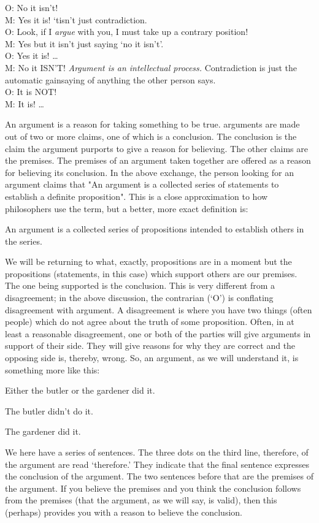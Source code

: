 {\begin{multicols}{2}
O: No it isn't!\\
M: Yes it is! ‘tisn't just contradiction.\\
O: Look, if I \emph{argue} with you, I must take up a contrary position!\\
M: Yes but it isn't just saying ‘no it isn't'.\\
O: Yes it is!
\ldots\\
M: No it ISN'T! \emph{Argument is an intellectual process.} Contradiction is just the automatic gainsaying of anything the other person says.\\
O: It is NOT!\\
M: It is!
\ldots 
\end{multicols}}

An argument is a reason for taking something to be true. \Glspl{argument} are made out of two or more claims, one of which is a \gls{conclusion}. The conclusion is the claim the argument purports to give a reason for believing. The other claims are the \glspl{premise}. The premises of an argument taken together are offered as a reason for believing its conclusion. In the above exchange, the person looking for an argument claims that "An argument is a collected series of statements to establish a definite proposition". This is a close approximation to how philosophers use the term, but a better, more exact definition is:
\begin{center}
An argument is a collected series of propositions intended to establish others in the series.
\end{center}
We will be returning to what, exactly, propositions are in a moment but the propositions (statements, in this case) which support others are our premises. The one being supported is the conclusion.  This is very different from a disagreement; in the above discussion, the contrarian (‘O') is conflating disagreement with argument.  A disagreement is where you have two things (often people) which do not agree about the truth of some proposition.  Often, in at least a reasonable disagreement, one or both of the parties will give arguments in support of their side. They will give reasons for why they are correct and the opposing side is, thereby, wrong. So, an argument, as we will understand it, is something more like this:
	\begin{earg}\label{argButlerGardner}
		\item[] Either the butler or the gardener did it.
		\item[] The butler didn't do it.
		\item[\therefore] The gardener did it.
	\end{earg}
We here have a series of sentences. The three dots on the third line, \gls{therefore}, of the argument are read ‘therefore.’ They indicate that the final sentence expresses the conclusion of the argument. The two sentences before that are the premises of the argument. If you believe the premises and you think the conclusion follows from the premises (that the argument, as we will say, is valid), then this (perhaps) provides you with a reason to believe the conclusion.


